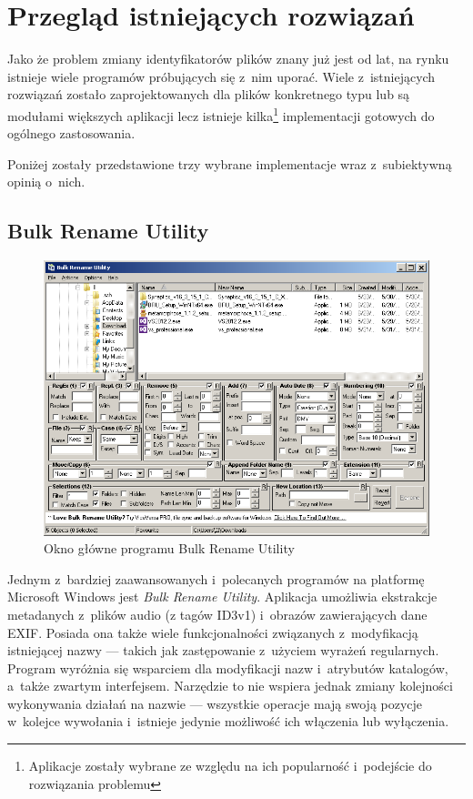 \chapter{Przegląd istniejących rozwiązań}
\par
Jako że problem zmiany identyfikatorów plików znany już jest od lat, na rynku istnieje wiele programów próbujących się z~nim uporać. Wiele z~istniejących rozwiązań zostało zaprojektowanych dla plików konkretnego typu lub są modułami większych aplikacji lecz istnieje kilka\footnote{Aplikacje zostały wybrane ze względu na ich popularność i~podejście do rozwiązania problemu} implementacji gotowych do ogólnego zastosowania.
\par
Poniżej zostały przedstawione trzy wybrane implementacje wraz z~subiektywną opinią o~nich.

\section{Bulk Rename Utility}
\begin{figure}[h]
\begin{center}
\includegraphics[scale=0.75]{img/bulkrename_window.png}
\end{center}
\caption{Okno główne programu Bulk Rename Utility}
\end{figure}

\par
Jednym z~bardziej zaawansowanych i~polecanych programów na platformę Microsoft Windows jest \textit{Bulk Rename Utility}. Aplikacja umożliwia ekstrakcje metadanych z~plików audio (z tagów ID3v1) i~obrazów zawierających dane EXIF. Posiada ona także wiele funkcjonalności związanych z~modyfikacją istniejącej nazwy --- takich jak zastępowanie z~użyciem wyrażeń regularnych.
Program wyróżnia się wsparciem dla modyfikacji nazw i~atrybutów katalogów, a~także zwartym interfejsem.
Narzędzie to nie wspiera jednak zmiany kolejności wykonywania działań na nazwie --- wszystkie operacje mają swoją pozycje w~kolejce wywołania i~istnieje jedynie możliwość ich włączenia lub wyłączenia.\\

